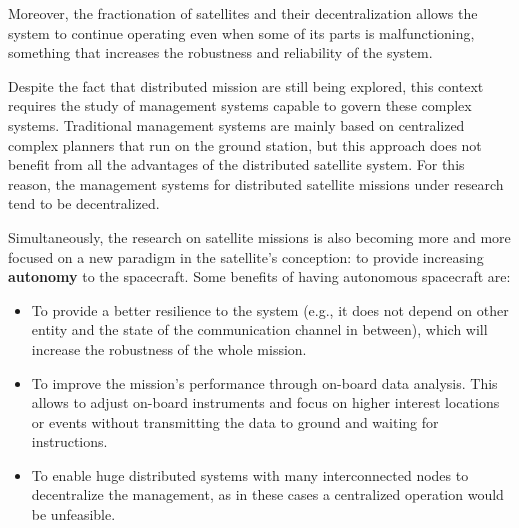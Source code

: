 Moreover, the fractionation of satellites and their decentralization allows the system to continue operating even when some of its parts is malfunctioning, something that increases the robustness and reliability of the system.

Despite the fact that distributed mission are still being explored, this context requires the study of management systems capable to govern these complex systems. Traditional management systems are mainly based on centralized complex planners that run on the ground station, but this approach does not benefit from all the advantages of the distributed satellite system. For this reason, the management systems for distributed satellite missions under research tend to be decentralized.

Simultaneously, the research on satellite missions is also becoming more and more focused on a new paradigm in the satellite's conception: to provide increasing \textbf{autonomy} to the spacecraft.
Some benefits of having autonomous spacecraft are:
\begin{itemize}
\item To provide a better resilience to the system (e.g., it does not depend on other entity and the state of the communication channel in between), which will increase the robustness of the whole mission.
\item To improve the mission's performance through on-board data analysis. This allows to adjust on-board instruments and focus on higher interest locations or events without transmitting the data to ground and waiting for instructions.
\item To enable huge distributed systems with many interconnected nodes to decentralize the management, as in these cases a centralized operation would be unfeasible.
\end{itemize}

